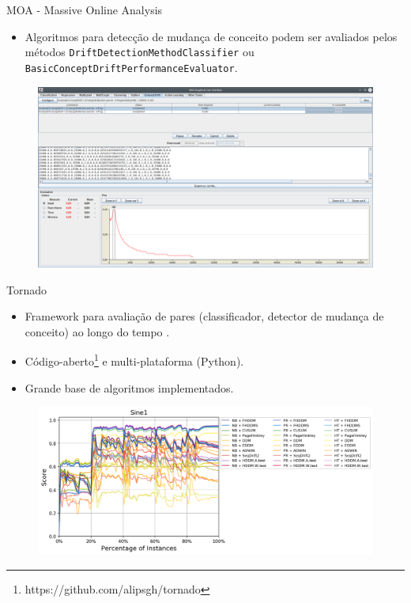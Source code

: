 \documentclass[10pt]{beamer}
\begin{document}
\begin{frame}{MOA - Massive Online Analysis}
    \begin{itemize}
        \item Algoritmos para detecção de mudança de conceito podem ser avaliados pelos métodos \texttt{DriftDetectionMethodClassifier} ou \texttt{BasicConceptDriftPerformanceEvaluator}.
    \end{itemize}

    \begin{figure}[H]
        \begin{center}
            \includegraphics[scale=0.25]{imagens/moa_avaliacao_cd.png}
        \end{center}
    \end{figure}
\end{frame}

\begin{frame}{Tornado}
    \begin{itemize}
        \item Framework para avaliação de pares (classificador, detector de mudança de conceito) ao longo do tempo \cite{Pesaranghader:Tornado}.
        \item Código-aberto\footnote{https://github.com/alipsgh/tornado} e multi-plataforma (Python).
        \item Grande base de algoritmos implementados.
    \end{itemize}

    \begin{figure}[H]
        \begin{center}
            \includegraphics[scale=0.4]{imagens/tornado_out2.png}
        \end{center}
    \end{figure}
\end{frame}
\end{document}
